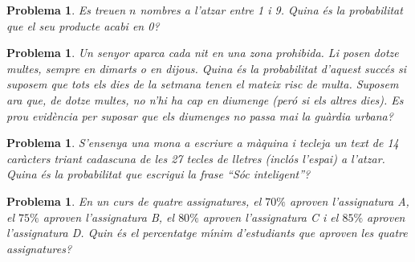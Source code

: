 \documentclass[11pt]{article}
\newcounter{prbcont}
\newtheorem{problema}[prbcont]{Problema}
\begin{document}


\begin{problema}
Es treuen $n$ nombres a l'atzar entre 1 i 9. Quina \'es la probabilitat que el seu producte
acabi en 0?
\end{problema}

\begin{problema}
Un senyor aparca cada nit en una zona prohibida. Li posen dotze multes, sempre en
dimarts o en dijous. Quina \'es la probabilitat d'aquest succ\'es si suposem que tots els
dies de la setmana tenen el mateix risc de multa. Suposem ara que, de dotze multes, no
n'hi ha cap en diumenge (per\'o si els altres dies). Es prou evid\`encia per suposar que els
diumenges no passa mai la gu\`ardia urbana?
\end{problema}

\begin{problema}
S'ensenya una mona a escriure a m\`aquina i tecleja un text de 14 car\`acters triant cadascuna
de les 27 tecles de lletres (incl\'os l'espai) a l'atzar. Quina \'es la probabilitat que escrigui
la frase ``S\'oc inteligent''?
\end{problema}

\begin{problema}
En un curs de quatre assignatures, el $70\%$ aproven l'assignatura A, el $75\%$ aproven l'assignatura B, el $80\%$ aproven l'assignatura C i el $85\%$ aproven l'assignatura D. Quin \'es el percentatge m\'{\i}nim d'estudiants que aproven les quatre assignatures?
\end{problema}


\end{document}
